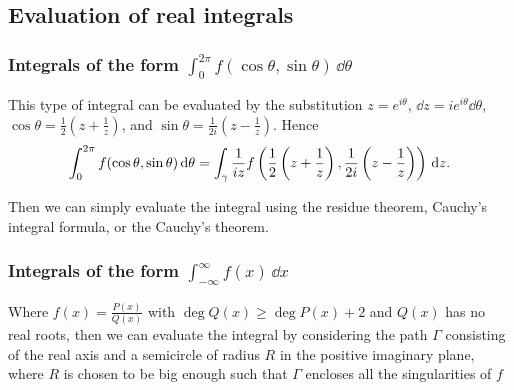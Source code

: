 \documentclass{report}
\begin{document}


\subsection{Evaluation of real integrals}

\subsubsection{Integrals of the form $\int_0^{2\pi} f(\cos\theta,\sin\theta)\,\dd{\theta}$}
This type of integral can be evaluated by the substitution $z=e^{i\theta}$, $\dd{z}=ie^{i\theta}\dd{\theta}$, $\cos\theta=\frac{1}{2}(z+\frac{1}{z})$, and $\sin\theta=\frac{1}{2i}(z-\frac{1}{z})$. Hence
\[
	\int_0^{2\pi} f(\cos\theta,\sin\theta)\,\mathrm{d}\theta = \int_\gamma \frac{1}{iz} f\left( \frac{1}{2}\left( z+\frac{1}{z} \right), \frac{1}{2i}\left( z-\frac{1}{z} \right) \right)\,\mathrm{d}z
	.\]

Then we can simply evaluate the integral using the residue theorem, Cauchy's integral formula, or the Cauchy's theorem.

\subsubsection{Integrals of the form $\int_{-\infty}^\infty f(x)\,\dd{x}$}

Where $f(x) = \frac{P(x)}{Q(x)}$ with $\deg Q(x) \geq \deg P(x) + 2$ and $Q(x)$ has no real roots, then we can evaluate the integral by considering the path $\Gamma$ consisting of the real axis and a semicircle of radius $R$ in the positive imaginary plane, where $R$ is chosen to be big enough such that $\Gamma$ encloses all the singularities of $f$
\end{document}
